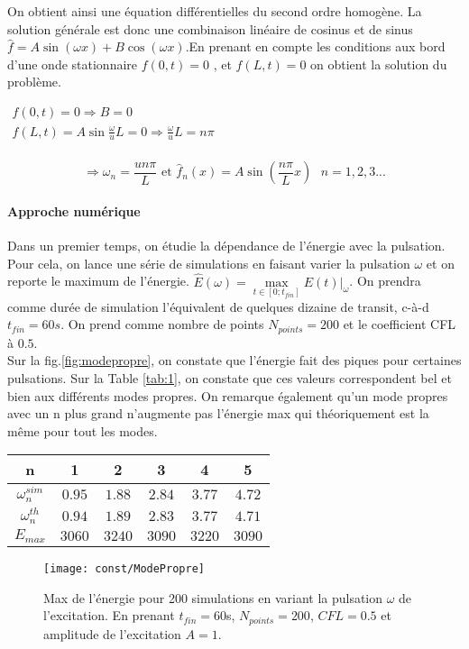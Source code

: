 \documentclass[a4paper,12pt,oneside]{article}
\def \be {\begin{equation}}
\def \ee {\end{equation}}
\begin{document}
On obtient ainsi une équation différentielles du second ordre homogène. La solution générale est donc une combinaison linéaire de cosinus et de sinus $\hat{f}=A\sin(\omega x)+B\cos(\omega x)$.En prenant en compte les conditions aux bord d'une onde stationnaire $f(0,t)=0$ ,  et $f(L,t)=0$ on obtient la solution du problème. 
\begin{center}
$ \begin{array}{cc}
    f(0,t)=0\Rightarrow B=0&  \\
    f(L,t)=A\sin{\frac{\omega}{u}L}=0\Rightarrow \frac{\omega}{u}L=n\pi &\\
\end{array}$
\end{center}
\be
  \Rightarrow \boxed{\omega_n =\frac{un\pi }{L}} \text{  et  } \boxed{\hat{f}_n(x)=A\sin{(\frac{n \pi }{L}x)}} \text{   }n=1,2,3...
\ee
\paragraph{Approche numérique}
Dans un premier temps, on étudie la dépendance de l'énergie avec la pulsation. Pour cela, on lance une série de simulations en faisant varier la pulsation $\omega$ et on reporte le maximum de l'énergie. $\hat{E}(\omega)=\underset{t\in[0;t_{fin}]}{\max} E(t)|_{\omega}$. On prendra comme durée de simulation l'équivalent de quelques dizaine de transit, c-à-d $t_{fin}=60s$. On prend comme nombre de points $N_{points}=200$ et le coefficient CFL à $0.5$.\\
Sur la fig.\eqref{fig:modepropre}, on constate que l'énergie fait des piques pour certaines pulsations. Sur la Table \eqref{tab:1}, on constate que ces valeurs correspondent bel et bien aux différents modes propres. On remarque également qu'un mode propres avec un n plus grand n'augmente pas l'énergie max qui théoriquement est la même pour tout les modes.
\begin{center}
\begin{tabular}{|c|c|c|c|c|c|}
\hline
   n &1 &2&3&4&5  \\
   \hline
   $\omega_n^{sim}$  &$0.95$ &$1.88$&$2.84$&$3.77$&$4.72$  \\
   \hline
   $\omega_n^{th}$ &$0.94$ &$1.89$&$2.83$&$3.77$&$4.71$  \\
   \hline
   $E_{max}$&$3060$ &$3240$&$3090$&$3220$&$3090$  \\
   \hline
\end{tabular}
\label{tab:1}
\end{center}
\begin{figure}
    \centering
    \texttt{[image: const/ModePropre]}
    \caption{Max de l'énergie pour 200 simulations en variant la pulsation $\omega$ de l'excitation. En prenant $t_{fin}=60$s, $N_{points}=200$, $CFL=0.5$ et amplitude de l'excitation $A=1$. }
    \label{fig:modepropre}
\end{figure}
\end{document}
